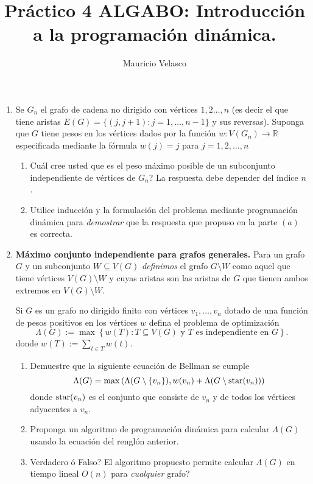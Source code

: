 \documentclass[12pt, a4paper]{article}
\date{}
\begin{document}
\title{Pr\'actico 4 ALGABO: Introducción a la programaci\'on dinámica.}
\author{Mauricio Velasco}
\maketitle{}
\begin{enumerate} 



\item Se $G_n$ el grafo de cadena no dirigido con v\'ertices $1,2\dots, n$ (es decir el que tiene aristas $E(G)=\{(j,j+1): j=1,\dots,n-1 \}$ y sus reversas). Suponga que $G$ tiene pesos en los v\'ertices dados por la funci\'on $w: V(G_n)\rightarrow \mathbb{R}$ especificada mediante la fórmula $w(j)=j$ para $j=1,2,\dots, n$ 
\begin{enumerate}
\item Cuál cree usted que es el peso m\'aximo  posible de un subconjunto independiente de vértices de $G_n$? La respuesta debe depender del \'indice $n$.
\item Utilice inducción y la formulaci\'on del problema mediante programaci\'on din\'amica para {\it demostrar} que la respuesta que propuso en la parte $(a)$ es correcta.
\end{enumerate}

\item {\bf M\'aximo conjunto independiente para grafos generales.}  Para un grafo $G$ y un subconjunto $W\subseteq V(G)$ {\it definimos} el grafo $G\setminus W$ como aquel que tiene v\'ertices $V(G)\setminus W$ y cuyas aristas son las aristas de $G$ que tienen ambos extremos en $V(G)\setminus W$.

Si $G$ es un grafo no dirigido finito con v\'ertices $v_1,\dots , v_n$ dotado de una funci\'on de pesos positivos en los v\'ertices $w$ defina el problema de optimización 
\[\Lambda(G):=\max\left\{ w(T): T\subseteq V(G)\text{ y $T$ es independiente en $G$}\right\}.\] 
donde $w(T):=\sum_{t\in T} w(t)$. 

\begin{enumerate}
\item  Demuestre que la siguiente ecuaci\'on de Bellman se cumple 
\[\Lambda(G) = \max\left( \Lambda(G\setminus\{v_n\}), w(v_n) + \Lambda(G\setminus {\rm star}(v_n))\right)\]
donde ${\rm star}(v_n)$ es el conjunto que consiste de $v_n$ y de todos los v\'ertices adyacentes a $v_n$.
\item Proponga un algoritmo de programaci\'on din\'amica para calcular $\Lambda(G)$ usando la ecuaci\'on del rengl\'on anterior.
\item Verdadero \'o Falso? El algoritmo propuesto permite calcular $\Lambda(G)$ en tiempo lineal $O(n)$ para {\it cualquier} grafo?
\end{enumerate}


\end{enumerate}
\end{document}
